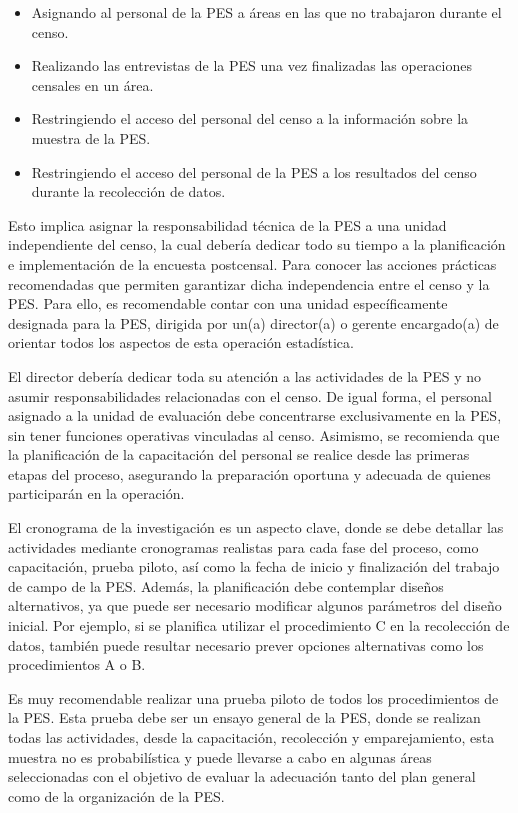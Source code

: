 \documentclass[
  12pt,
]{book}
\providecommand{\tightlist}{%
  \setlength{\itemsep}{0pt}\setlength{\parskip}{0pt}}
\begin{document}
\begin{itemize}
\tightlist
\item
  Asignando al personal de la PES a áreas en las que no trabajaron durante el censo.
\item
  Realizando las entrevistas de la PES una vez finalizadas las operaciones censales en un área.
\item
  Restringiendo el acceso del personal del censo a la información sobre la muestra de la PES.
\item
  Restringiendo el acceso del personal de la PES a los resultados del censo durante la recolección de datos.
\end{itemize}

Esto implica asignar la responsabilidad técnica de la PES a una unidad independiente del censo, la cual debería dedicar todo su tiempo a la planificación e implementación de la encuesta postcensal. Para conocer las acciones prácticas recomendadas que permiten garantizar dicha independencia entre el censo y la PES. Para ello, es recomendable contar con una unidad específicamente designada para la PES, dirigida por un(a) director(a) o gerente encargado(a) de orientar todos los aspectos de esta operación estadística.

El director debería dedicar toda su atención a las actividades de la PES y no asumir responsabilidades relacionadas con el censo. De igual forma, el personal asignado a la unidad de evaluación debe concentrarse exclusivamente en la PES, sin tener funciones operativas vinculadas al censo. Asimismo, se recomienda que la planificación de la capacitación del personal se realice desde las primeras etapas del proceso, asegurando la preparación oportuna y adecuada de quienes participarán en la operación.

El cronograma de la investigación es un aspecto clave, donde se debe detallar las actividades mediante cronogramas realistas para cada fase del proceso, como capacitación, prueba piloto, así como la fecha de inicio y finalización del trabajo de campo de la PES. Además, la planificación debe contemplar diseños alternativos, ya que puede ser necesario modificar algunos parámetros del diseño inicial. Por ejemplo, si se planifica utilizar el procedimiento C en la recolección de datos, también puede resultar necesario prever opciones alternativas como los procedimientos A o B.

Es muy recomendable realizar una prueba piloto de todos los procedimientos de la PES. Esta prueba debe ser un ensayo general de la PES, donde se realizan todas las actividades, desde la capacitación, recolección y emparejamiento, esta muestra no es probabilística y puede llevarse a cabo en algunas áreas seleccionadas con el objetivo de evaluar la adecuación tanto del plan general como de la organización de la PES.
\end{document}
